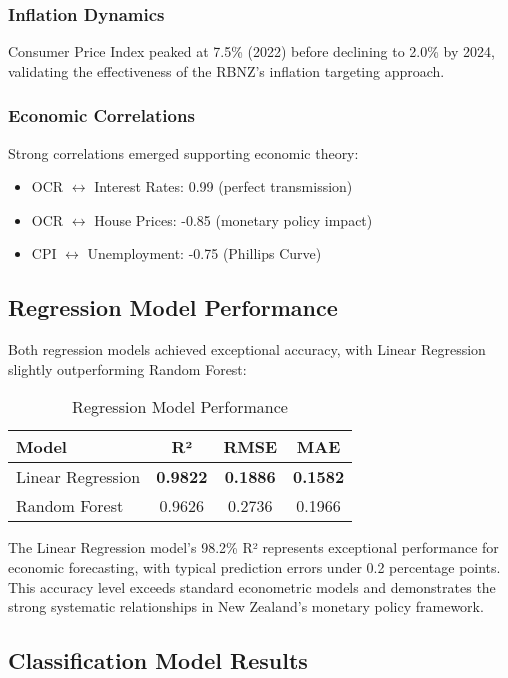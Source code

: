 \documentclass[11pt,a4paper]{article}
\begin{document}
	\subsubsection{Inflation Dynamics}
	Consumer Price Index peaked at 7.5\% (2022) before declining to 2.0\% by 2024, validating the effectiveness of the RBNZ's inflation targeting approach.
	
	\subsubsection{Economic Correlations}
	Strong correlations emerged supporting economic theory:
	\begin{itemize}
		\item OCR $\leftrightarrow$ Interest Rates: 0.99 (perfect transmission)
		\item OCR $\leftrightarrow$ House Prices: -0.85 (monetary policy impact)
		\item CPI $\leftrightarrow$ Unemployment: -0.75 (Phillips Curve)
	\end{itemize}
	
	\subsection{Regression Model Performance}
	
	Both regression models achieved exceptional accuracy, with Linear Regression slightly outperforming Random Forest:
	
	\begin{table}[H]
		\centering
		\caption{Regression Model Performance}
		\begin{tabular}{lccc}
			\toprule
			Model & R² & RMSE & MAE \\
			\midrule
			Linear Regression & \textbf{0.9822} & \textbf{0.1886} & \textbf{0.1582} \\
			Random Forest & 0.9626 & 0.2736 & 0.1966 \\
			\bottomrule
		\end{tabular}
	\end{table}
	
	The Linear Regression model's 98.2\% R² represents exceptional performance for economic forecasting, with typical prediction errors under 0.2 percentage points. This accuracy level exceeds standard econometric models and demonstrates the strong systematic relationships in New Zealand's monetary policy framework.
	
	\subsection{Classification Model Results}
	
\end{document}
